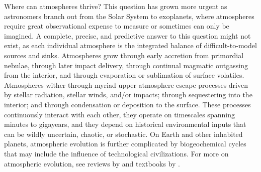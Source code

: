 \documentclass[modern,linenumbers,trackchanges]{aastex7}
\begin{document}
Where can atmospheres thrive? This question has grown more urgent as astronomers branch out from the Solar System to exoplanets, where atmospheres require great observational expense to measure or sometimes can only be imagined. A complete, precise, and predictive answer to this question might not exist, as each individual atmosphere is the integrated balance of difficult-to-model sources and sinks. Atmospheres grow through early accretion from primordial nebulae, through later impact delivery, through continual magmatic outgassing from the interior, and through evaporation or sublimation of surface volatiles. Atmospheres wither through myriad upper-atmosphere escape processes driven by stellar radiation, stellar winds, and/or impacts; through sequestering into the interior; and through condensation or deposition to the surface. These processes continuously interact with each other, they operate on timescales spanning minutes to gigayears, and they depend on historical environmental inputs that can be wildly uncertain, chaotic, or stochastic. On Earth and other inhabited planets, atmospheric evolution is further complicated by biogeochemical cycles that may include the influence of technological civilizations. For more on atmospheric evolution, see reviews by \citet{johnsonExospheresAtmosphericEscape2008, lammerAtmosphericEscapeEvolution2008, tianAtmosphericEscapeSolar2015b, owenAtmosphericEscapeEvolution2019a,  gronoffAtmosphericEscapeProcesses2020, wordsworthAtmospheresRockyExoplanets2022} and textbooks by \citet{chamberlainTheoryPlanetaryAtmospheres1987, pierrehumbertPrinciplesPlanetaryClimate2010, seagerExoplanetAtmospheresPhysical2010, ingersollPlanetaryClimates2013, lissauerFundamentalPlanetaryScience2019}.
 
\end{document}
